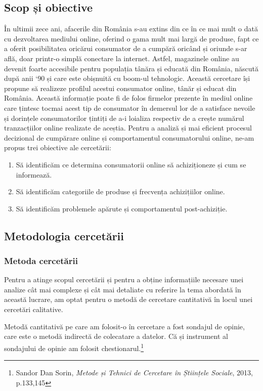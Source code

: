 \documentclass[a4paper, 12pt]{article}
\begin{document}
	\subsection{Scop și obiective}
	\qquad În ultimii zece ani, afacerile din România s-au extins din ce în ce mai mult o dată cu dezvoltarea mediului online, oferind o gama mult mai largă de produse, fapt ce a oferit posibilitatea oricărui consumator de a cumpără oricând și oriunde s-ar află, doar printr-o simplă conectare la internet. Astfel, magazinele online au devenit foarte accesibile pentru populația tânăra și educată din România, născută după anii `90 și care este obișnuită cu boom-ul tehnologic. Această cercetare își propune să realizeze profilul  acestui consumator online, tânăr și educat din România.  Această informație poate fi de folos  firmelor prezente în mediul online care țintesc tocmai acest tip de consumator în demersul lor de a satisface nevoile și dorințele consumatorilor țintiți de a-i loializa respectiv de a crește numărul tranzacțiilor online realizate de aceștia. Pentru a analiză și mai eficient procesul decizional de cumpărare online și comportamentul consumatorului online, ne-am propus trei obiective ale cercetării: 
	\begin{enumerate}[(1)]
		\item Să identificăm ce determina consumatorii online să achiziționeze și cum se informează.
		\item Să identificăm categoriile de produse și frecvența achizițiilor online.
		\item Să identificăm problemele apărute și comportamentul post-achiziție.
	\end{enumerate}
	\subsection{Metodologia cercetării}
	\subsubsection{Metoda cercetării}
	\qquad\space Pentru a atinge scopul cercetării și pentru a obține informațiile necesare unei analize cât mai complexe și cât mai detaliate cu referire la tema abordată în această lucrare, am optat pentru o metodă de cercetare cantitativă în locul unei cercetări calitative.
	
	\quad Metodă cantitativă pe care am folosit-o în cercetare a fost sondajul de opinie, care este o metodă indirectă de colecatare a datelor. Că și instrument al sondajului de opinie am folosit chestionarul.\footnote{Sandor Dan Sorin, \textit{Metode și Tehnici de Cercetare în Științele Sociale}, 2013, p.133,145}
\end{document}
